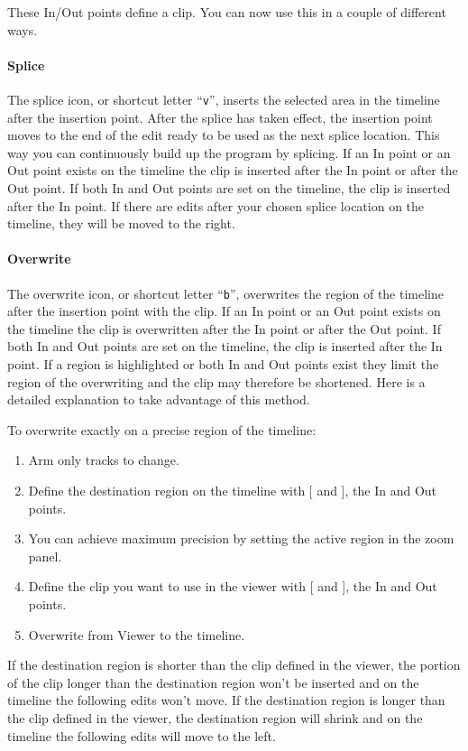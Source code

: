 These In/Out points define a clip.  You can now use this in a couple
of different ways.

\paragraph{Splice} The splice icon, or shortcut letter “\texttt{v}”,
inserts the selected area in the timeline after the insertion point.
After the splice has taken effect, the insertion point moves to the
end of the edit ready to be used as the next splice location. This
way you can continuously build up the program by splicing.  If an In
point or an Out point exists on the timeline the clip is inserted
after the In point or after the Out point. If both In and Out points
are set on the timeline, the clip is inserted after the In point. If
there are edits after your chosen splice location on the timeline,
they will be moved to the right.

\paragraph{Overwrite} The overwrite icon, or shortcut letter
“\texttt{b}”, overwrites the region of the timeline after the
insertion point with the clip. If an In point or an Out point exists
on the timeline the clip is overwritten after the In point or after
the Out point. If both In and Out points are set on the timeline,
the clip is inserted after the In point. If a region is highlighted
or both In and Out points exist they limit the region of the
overwriting and the clip may therefore be shortened. Here is a
detailed explanation to take advantage of this method.

To overwrite exactly on a precise region of the timeline:

\begin{enumerate} [noitemsep]
\item Arm only tracks to change.
\item Define the destination region on the timeline with [ and
  ], the In and Out points.
\item You can achieve maximum precision by setting the active
  region in the zoom panel.
\item Define the clip you want to use in the viewer with [ and
  ], the In and Out points.
\item Overwrite from Viewer to the timeline.
\end{enumerate}

If the destination region is shorter than the clip defined in the
viewer, the portion of the clip longer than the destination region
won't be inserted and on the timeline the following edits won't
move.  If the destination region is longer than the clip defined in
the viewer, the destination region will shrink and on the timeline
the following edits will move to the left.

